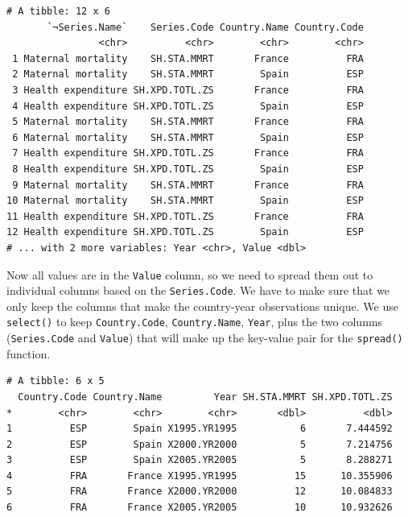 \documentclass[]{article}
\newenvironment{Shaded}{\begin{snugshade}}{\end{snugshade}}
\newcommand{\KeywordTok}[1]{\textcolor[rgb]{0.13,0.29,0.53}{\textbf{{#1}}}}
\newcommand{\StringTok}[1]{\textcolor[rgb]{0.31,0.60,0.02}{{#1}}}
\newcommand{\NormalTok}[1]{{#1}}
\theoremstyle{definition}
\theoremstyle{definition}
\theoremstyle{definition}
\theoremstyle{remark}
\begin{document}
\begin{verbatim}
# A tibble: 12 x 6
       `¬Series.Name`    Series.Code Country.Name Country.Code
                <chr>          <chr>        <chr>        <chr>
 1 Maternal mortality    SH.STA.MMRT       France          FRA
 2 Maternal mortality    SH.STA.MMRT        Spain          ESP
 3 Health expenditure SH.XPD.TOTL.ZS       France          FRA
 4 Health expenditure SH.XPD.TOTL.ZS        Spain          ESP
 5 Maternal mortality    SH.STA.MMRT       France          FRA
 6 Maternal mortality    SH.STA.MMRT        Spain          ESP
 7 Health expenditure SH.XPD.TOTL.ZS       France          FRA
 8 Health expenditure SH.XPD.TOTL.ZS        Spain          ESP
 9 Maternal mortality    SH.STA.MMRT       France          FRA
10 Maternal mortality    SH.STA.MMRT        Spain          ESP
11 Health expenditure SH.XPD.TOTL.ZS       France          FRA
12 Health expenditure SH.XPD.TOTL.ZS        Spain          ESP
# ... with 2 more variables: Year <chr>, Value <dbl>
\end{verbatim}

Now all values are in the \texttt{Value} column, so we need to spread
them out to individual columns based on the \texttt{Series.Code}. We
have to make sure that we only keep the columns that make the
country-year observations unique. We use \texttt{select()} to keep
\texttt{Country.Code}, \texttt{Country.Name}, \texttt{Year}, plus the
two columns (\texttt{Series.Code} and \texttt{Value}) that will make up
the key-value pair for the \texttt{spread()} function.

\begin{Shaded}
\end{Shaded}

\begin{verbatim}
# A tibble: 6 x 5
  Country.Code Country.Name         Year SH.STA.MMRT SH.XPD.TOTL.ZS
*        <chr>        <chr>        <chr>       <dbl>          <dbl>
1          ESP        Spain X1995.YR1995           6       7.444592
2          ESP        Spain X2000.YR2000           5       7.214756
3          ESP        Spain X2005.YR2005           5       8.288271
4          FRA       France X1995.YR1995          15      10.355906
5          FRA       France X2000.YR2000          12      10.084833
6          FRA       France X2005.YR2005          10      10.932626
\end{verbatim}
\end{document}
